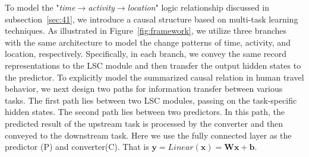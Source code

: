 \documentclass[sigconf]{acmart}
\begin{document}
    To model the "\textit{time$\to$activity$\rightarrow$location}" logic relationship discussed in subsection~\ref{sec:41}, we introduce a causal structure based on multi-task learning techniques. As illustrated in Figure~\ref{fig:framework}, we utilize three branches with the same architecture to model the change patterns of time, activity, and location, respectively. 
    Specifically, in each branch, we convey the same record representations to the LSC module and then transfer the output hidden states to the predictor. To explicitly model the summarized causal relation in human travel behavior, we next design two paths for information transfer between various tasks. The first path lies between two LSC modules, passing on the task-specific hidden states. The second path lies between two predictors. In this path, the predicted result of the upstream task is processed by the converter and then conveyed to the downstream task. Here we use the fully connected layer as the predictor (P) and converter(C). That is $\boldsymbol{y} = Linear(\boldsymbol{x})=\boldsymbol{W}\boldsymbol{x}+\boldsymbol{b}$.
\end{document}
